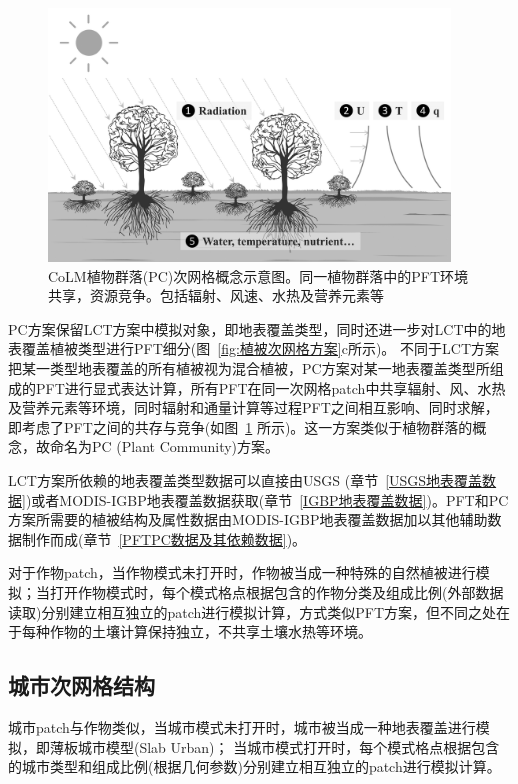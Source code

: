 {
\begin{figure}[htbp]
\centering
\includegraphics[width=0.95\textwidth]{Figures/模式构架/植物群落示意图.png}
\caption[CoLM植物群落(PC)次网格概念示意图]{CoLM植物群落(PC)次网格概念示意图。同一植物群落中的PFT环境共享，资源竞争。包括辐射、风速、水热及营养元素等}
\label{fig:植物群落示意图}
\end{figure}
}

PC方案保留LCT方案中模拟对象，即地表覆盖类型，同时还进一步对LCT中的地表覆盖植被类型进行PFT细分(图~\ref{fig:植被次网格方案}c所示)。
不同于LCT方案把某一类型地表覆盖的所有植被视为混合植被，PC方案对某一地表覆盖类型所组成的PFT进行显式表达计算，所有PFT在同一次网格patch中共享辐射、风、水热及营养元素等环境，同时辐射和通量计算等过程PFT之间相互影响、同时求解，即考虑了PFT之间的共存与竞争(如图~\ref{fig:植物群落示意图} 所示)。这一方案类似于植物群落的概念，故命名为PC (Plant Community)方案。

LCT方案所依赖的地表覆盖类型数据可以直接由USGS (章节~\ref{USGS地表覆盖数据})或者MODIS-IGBP地表覆盖数据获取(章节~\ref{IGBP地表覆盖数据})。PFT和PC方案所需要的植被结构及属性数据由MODIS-IGBP地表覆盖数据加以其他辅助数据制作而成(章节~\ref{PFTPC数据及其依赖数据})。

对于作物patch，当作物模式未打开时，作物被当成一种特殊的自然植被进行模拟；当打开作物模式时，每个模式格点根据包含的作物分类及组成比例(外部数据读取)分别建立相互独立的patch进行模拟计算，方式类似PFT方案，但不同之处在于每种作物的土壤计算保持独立，不共享土壤水热等环境。

\subsection{城市次网格结构}
城市patch与作物类似，当城市模式未打开时，城市被当成一种地表覆盖进行模拟，即薄板城市模型(Slab Urban)；
当城市模式打开时，每个模式格点根据包含的城市类型和组成比例(根据几何参数)分别建立相互独立的patch进行模拟计算。


